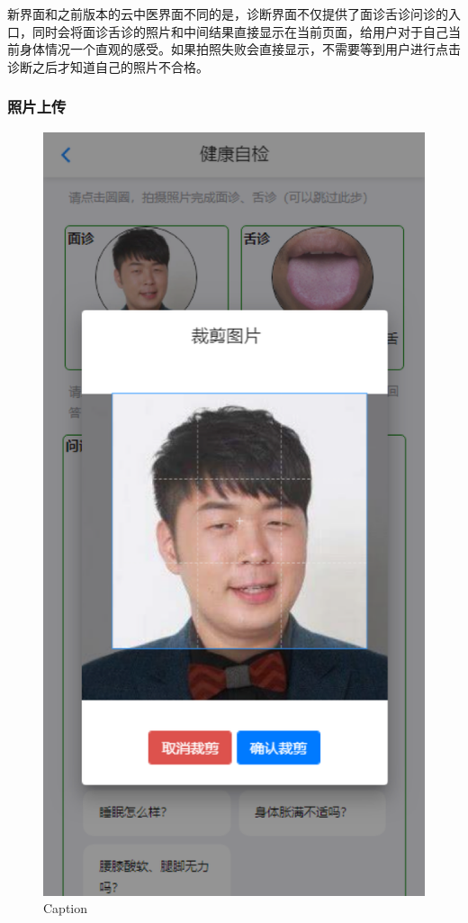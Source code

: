 新界面和之前版本的云中医界面不同的是，诊断界面不仅提供了面诊舌诊问诊的入口，同时会将面诊舌诊的照片和中间结果直接显示在当前页面，给用户对于自己当前身体情况一个直观的感受。如果拍照失败会直接显示，不需要等到用户进行点击诊断之后才知道自己的照片不合格。
	
\subsubsection{照片上传}

\begin{figure}[h]
    \centering
    \includegraphics{images/crop.png}
    \caption{Caption}
    \label{fig:crop}
\end{figure}
